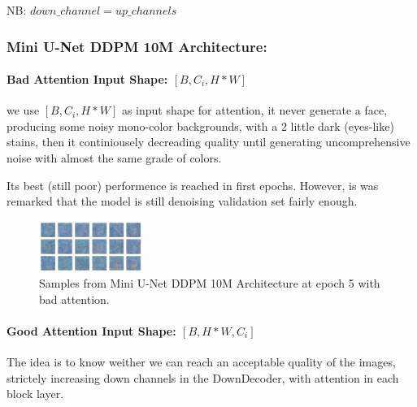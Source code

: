 \documentclass[twocolumn,superscriptaddress,aps]{revtex4-1}
\begin{document}
NB: $down\_channel = up\_channels$

\subsubsection{Mini U-Net DDPM 10M Architecture:}
\paragraph[short]{Bad Attention Input Shape: $[B, C_i, H*W]$}
we use $[B, C_i, H*W]$ as input shape for attention, it never generate a face, producing some noisy mono-color backgrounds, with a 2 little dark (eyes-like) stains, then it continiousely decreading quality until generating uncomprehensive noise with almost the same grade of colors.

Its best (still poor) performence is reached in first epochs. However, is was remarked that the model is still denoising validation set fairly enough.

\begin{figure}[H]
    \centering
    \includegraphics[width=0.3\textwidth]{figures/10M_epoch5_slightely diff_cains_bad_attention_.png}
    \caption{Samples from Mini U-Net DDPM 10M Architecture at epoch 5 with bad attention.}
    \label{fig:10M_epoch5_slightely_diff_cains_bad_attention_}
\end{figure}


\paragraph[short]{Good Attention Input Shape: $[B, H*W, C_i]$}
The idea is to know weither we can reach an acceptable quality of the images, strictely increasing down channels in the DownDecoder, with attention in each block layer.
\end{document}
